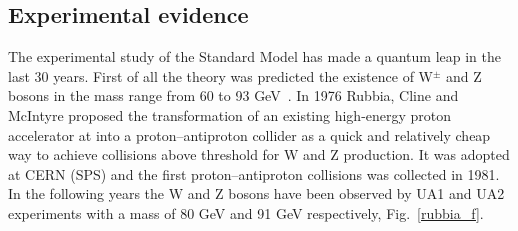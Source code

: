 \subsection*{Experimental evidence}
The experimental study  of the Standard Model  has made a quantum leap in the last 30 years. First of all the theory was predicted the existence of W$^{\pm}$ and Z bosons in the mass range from 60 to 93 GeV~\cite{doi:10.1142/9789814644150_0006}. 
In 1976 Rubbia, Cline and McIntyre proposed the transformation of an existing high-energy proton accelerator at  into a proton–antiproton collider as a quick and relatively cheap way to achieve collisions above threshold for W and Z production.  It was adopted at CERN (SPS) and the first  proton–antiproton
 collisions was collected in 1981. In the following years the W and Z bosons have been observed by UA1 and UA2 experiments with a mass of 80 GeV and 91 GeV respectively, Fig.~\ref{rubbia_f}. 
